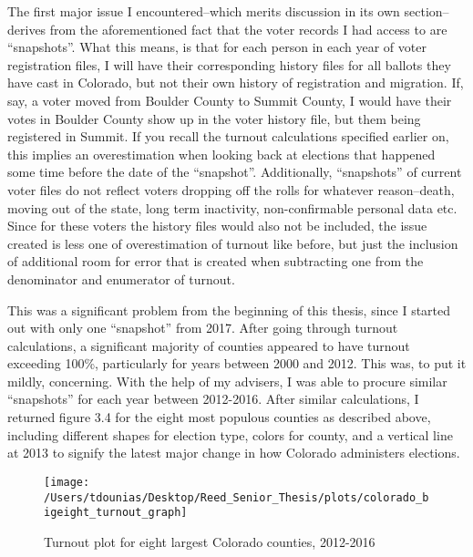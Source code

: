 \documentclass[12pt,twoside]{reedthesis}
\begin{document}
  The first major issue I encountered--which merits discussion in its own
  section--derives from the aforementioned fact that the voter records I
  had access to are ``snapshots''. What this means, is that for each
  person in each year of voter registration files, I will have their
  corresponding history files for all ballots they have cast in Colorado,
  but not their own history of registration and migration. If, say, a
  voter moved from Boulder County to Summit County, I would have their
  votes in Boulder County show up in the voter history file, but them
  being registered in Summit. If you recall the turnout calculations
  specified earlier on, this implies an overestimation when looking back
  at elections that happened some time before the date of the
  ``snapshot''. Additionally, ``snapshots'' of current voter files do not
  reflect voters dropping off the rolls for whatever reason--death, moving
  out of the state, long term inactivity, non-confirmable personal data
  etc. Since for these voters the history files would also not be
  included, the issue created is less one of overestimation of turnout
  like before, but just the inclusion of additional room for error that is
  created when subtracting one from the denominator and enumerator of
  turnout.
  
  This was a significant problem from the beginning of this thesis, since
  I started out with only one ``snapshot'' from 2017. After going through
  turnout calculations, a significant majority of counties appeared to
  have turnout exceeding 100\%, particularly for years between 2000 and
  2012. This was, to put it mildly, concerning. With the help of my
  advisers, I was able to procure similar ``snapshots'' for each year
  between 2012-2016. After similar calculations, I returned figure 3.4 for
  the eight most populous counties as described above, including different
  shapes for election type, colors for county, and a vertical line at 2013
  to signify the latest major change in how Colorado administers
  elections.
  
  \begin{figure}
  
  {\centering \texttt{[image: /Users/tdounias/Desktop/Reed\_Senior\_Thesis/plots/colorado\_bigeight\_turnout\_graph]} 
  
  }
  
  \caption[Turnout plot for eight largest Colorado counties, 2012-2016]{Turnout plot for eight largest Colorado counties, 2012-2016}\label{fig:big eight turnout plot}
  \end{figure}
  
\end{document}
